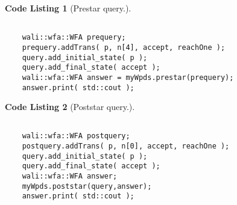 \documentclass[english,a4paper,11pt]{article}
\theoremstyle{definition}
\newtheorem{codelist}{Code Listing}[section]
\begin{document}
\begin{codelist}[Prestar query.]
\label{Prestar}
\begin{lstlisting}
    
    wali::wfa::WFA prequery;
    prequery.addTrans( p, n[4], accept, reachOne );
    query.add_initial_state( p );
    query.add_final_state( accept );
    wali::wfa::WFA answer = myWpds.prestar(prequery);
    answer.print( std::cout );
\end{lstlisting}
\end{codelist}

\begin{codelist}[Poststar query.]
\label{Poststar}
\begin{lstlisting}

    wali::wfa::WFA postquery;
    postquery.addTrans( p, n[0], accept, reachOne );
    query.add_initial_state( p );
    query.add_final_state( accept );
    wali::wfa::WFA answer;
    myWpds.poststar(query,answer);
    answer.print( std::cout );
\end{lstlisting}
\end{codelist}


%

%

%





\end{document}
